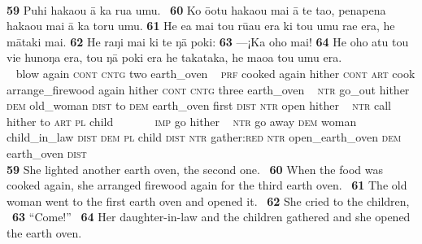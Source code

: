 {~

\bigskip\gll
\textbf{\textup{59}} Puhi haka{\ꞌ}ou {\ꞌ}ā ka rua {\ꞌ}umu. ~\textbf{\textup{60}} Ko {\ꞌ}ō{\ꞌ}otu haka{\ꞌ}ou mai {\ꞌ}ā te ta{\ꞌ}o, penapena haka{\ꞌ}ou mai {\ꞌ}ā ka toru {\ꞌ}umu. \textbf{\textup{61}} He e{\ꞌ}a mai tou rū{\ꞌ}au era ki tou {\ꞌ}umu ra{\ꞌ}e era, he mātaki mai. \textbf{\textup{62}} He raŋi mai ki te ŋā poki: \textbf{\textup{63}} —¡Ka oho mai! \textbf{\textup{64}} He oho atu tou vi{\ꞌ}e hunoŋa era, tou ŋā poki era he takataka, he ma{\ꞌ}oa tou {\ꞌ}umu era.\\
~ blow again \textsc{cont} \textsc{cntg} two earth\_oven ~ \textsc{prf} cooked again hither \textsc{cont} \textsc{art} cook arrange\_firewood again hither \textsc{cont} \textsc{cntg} three earth\_oven  ~ \textsc{ntr} go\_out hither \textsc{dem} old\_woman \textsc{dist} to \textsc{dem} earth\_oven first \textsc{dist} \textsc{ntr} open hither  ~ \textsc{ntr} call hither to \textsc{art} \textsc{pl} child ~ ~~~~~\textsc{imp} go hither  ~ \textsc{ntr} go away \textsc{dem} woman child\_in\_law \textsc{dist} \textsc{dem} \textsc{pl} child \textsc{dist} \textsc{ntr} gather:\textsc{red} \textsc{ntr} open\_earth\_oven \textsc{dem} earth\_oven \textsc{dist}\\

\medskip\glt
\textbf{\textup{59}} She lighted another earth oven, the second one. ~\textbf{\textup{60}} When the food was cooked again, she arranged firewood again for the third earth oven. ~\textbf{\textup{61}} The old woman went to the first earth oven and opened it. ~\textbf{\textup{62}} She cried to the children, ~\textbf{\textup{63}} “Come!” ~\textbf{\textup{64}} Her daughter-in-law and the children gathered and she opened the earth oven.


~

}
